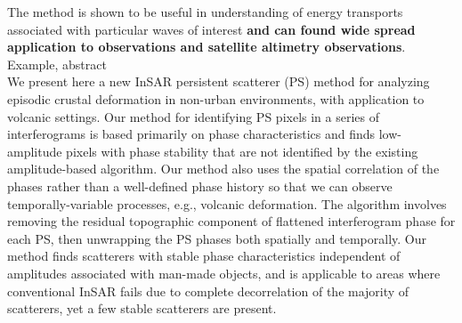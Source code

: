  The method is shown to be useful in understanding of energy transports associated with particular waves of interest\textbf{ and can found wide spread application to observations and satellite altimetry observations}.\\
Example, abstract\\
We present here a new InSAR persistent scatterer (PS) method for analyzing episodic crustal deformation in non-urban environments, with application to volcanic settings. Our method for identifying PS pixels in a series of interferograms is based primarily on phase characteristics and finds low-amplitude pixels with phase stability that are not identified by the existing amplitude-based algorithm. Our method also uses the spatial correlation of the phases rather than a well-defined phase history so that we can observe temporally-variable processes, e.g., volcanic deformation. The algorithm involves removing the residual topographic component of flattened interferogram phase for each PS, then unwrapping the PS phases both spatially and temporally. Our method finds scatterers with stable phase characteristics independent of amplitudes associated with man-made objects, and is applicable to areas where conventional InSAR fails due to complete decorrelation of the majority of scatterers, yet a few stable scatterers are present.\\


